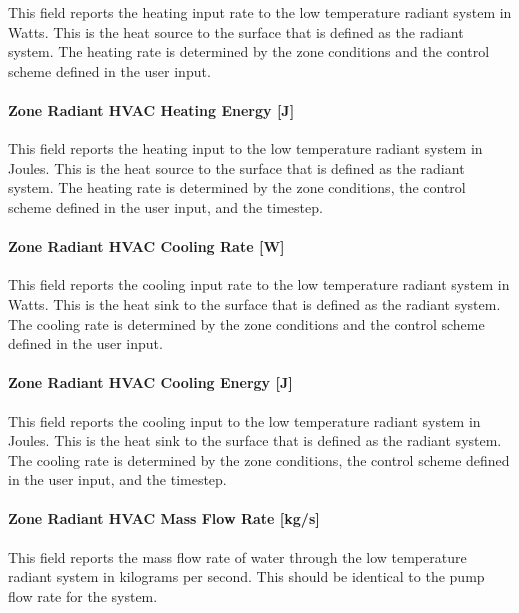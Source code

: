 This field reports the heating input rate to the low temperature radiant system in Watts. This is the heat source to the surface that is defined as the radiant system. The heating rate is determined by the zone conditions and the control scheme defined in the user input.

\paragraph{Zone Radiant HVAC Heating Energy {[}J{]}}\label{zone-radiant-hvac-heating-energy-j-1}

This field reports the heating input to the low temperature radiant system in Joules. This is the heat source to the surface that is defined as the radiant system. The heating rate is determined by the zone conditions, the control scheme defined in the user input, and the timestep.

\paragraph{Zone Radiant HVAC Cooling Rate {[}W{]}}\label{zone-radiant-hvac-cooling-rate-w-1}

This field reports the cooling input rate to the low temperature radiant system in Watts. This is the heat sink to the surface that is defined as the radiant system. The cooling rate is determined by the zone conditions and the control scheme defined in the user input.

\paragraph{Zone Radiant HVAC Cooling Energy {[}J{]}}\label{zone-radiant-hvac-cooling-energy-j-1}

This field reports the cooling input to the low temperature radiant system in Joules. This is the heat sink to the surface that is defined as the radiant system. The cooling rate is determined by the zone conditions, the control scheme defined in the user input, and the timestep.

\paragraph{Zone Radiant HVAC Mass Flow Rate {[}kg/s{]}}\label{zone-radiant-hvac-mass-flow-rate-kgs}

This field reports the mass flow rate of water through the low temperature radiant system in kilograms per second. This should be identical to the pump flow rate for the system.

